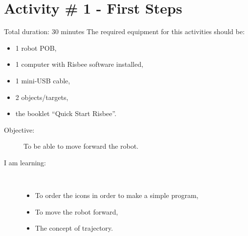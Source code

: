 \section{Activity \# 1 - First Steps}

Total duration: 30 minutes
The required equipment for this activities should be:
\begin{itemize}
\item 1 robot POB,
\item 1 computer with Risbee software installed,
\item 1 mini-USB cable,
\item 2 objects/targets,
\item the booklet ``Quick Start Risbee''.
\end{itemize}
\frameboxend

\begin{description}
\item[Objective:] To be able to move forward the robot.
\item[I am learning:] \hfill \\ \vspace{-4ex}
  \begin{itemize}
  \item To order the icons in order to make a simple program,
  \item To move the robot forward,
  \item The concept of trajectory.
  \end{itemize}
\end{description}
\frameboxend

